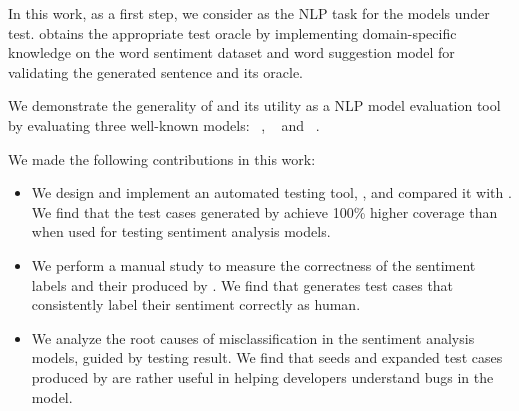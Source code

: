 In this work, as a first step, we consider \sa as the NLP task for the models under test. 
\tool obtains the
appropriate test oracle by implementing domain-specific
knowledge on the word sentiment dataset and word suggestion model for validating the generated sentence and its oracle.

We demonstrate the generality of \tool and its utility as a NLP model evaluation
tool by evaluating three well-known \sa models: \Bert~\cite{devlin2019bert},
\Roberta~\cite{liu2019roberta} and \Dbert~\cite{sanh2019distilbert}.


\vspace{2pt}
\noindent
We made the following contributions in this work:

\begin{itemize}[topsep=3pt,itemsep=3pt,partopsep=0ex,parsep=0ex,leftmargin=*]
\item We design and implement an automated testing tool, \tool, and compared it with \Cklst. We find that the test cases generated by \tool achieve 100\% higher coverage than \Cklst when used for testing sentiment analysis models. 
%
\item We perform a manual study to
measure the correctness of the sentiment labels and their \lcs produced by \tool. We find that \tool generates test cases that consistently label their sentiment correctly as human.
%
\item We analyze the root causes of misclassification in the sentiment analysis models, guided by \tool testing result. We find that seeds and expanded test cases produced by \tool are rather useful in helping developers understand bugs in the model.
\end{itemize}







